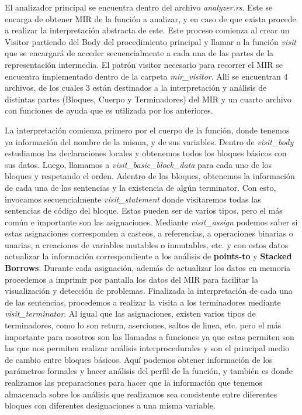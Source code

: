 El analizador principal se encuentra dentro del archivo \textit{analyzer.rs}. Este se encarga de obtener MIR de la función a analizar, y en caso de que exista procede a realizar la interpretación abstracta de este. Este proceso comienza al crear un Visitor partiendo del Body del procedimiento principal y llamar a la función \textit{visit} que se encargará de acceder secuencialmente a cada una de las partes de la representación intermedia. El patrón visitor necesario para recorrer el MIR se encuentra implementado dentro de la carpeta \textit{mir\_visitor}. Allí se encuentran 4 archivos, de los cuales 3 están destinados a la interpretación y análisis de distintas partes (Bloques, Cuerpo y Terminadores) del MIR y un cuarto archivo con funciones de ayuda que es utilizada por los anteriores.

La interpretación comienza primero por el cuerpo de la función, donde tenemos ya información del nombre de la misma, y de sus variables. Dentro de \textit{visit\_body} estudiamos las declaraciones locales y obtenemos todos los bloques básicos con sus datos. Luego, llamamos a \textit{visit\_basic\_block\_data} para cada uno de los bloques y respetando el orden. Adentro de los bloques, obtenemos la información de cada una de las sentencias y la existencia de algún terminator. Con esto, invocamos secuencialmente \textit{visit\_statement} donde visitaremos todas las sentencias de código del bloque. Estas pueden ser de varios tipos, pero el más común e importante son las asignaciones. Mediante \textit{visit\_assign} podemos saber si estas asignaciones corresponden a casteos, a referencias, a operaciones binarias o unarias, a creaciones de variables mutables o inmutables, etc. y con estos datos actualizar la información correspondiente a los análisis de \textbf{points-to} y \textbf{Stacked Borrows}. Durante cada asignación, además de actualizar los datos en memoria procedemos a imprimir por pantalla los datos del MIR para facilitar la visualización y detección de problemas. Finalizada la interpretación de cada una de las sentencias, procedemos a realizar la visita a los terminadores mediante \textit{visit\_terminator}. Al igual que las asignaciones, existen varios tipos de terminadores, como lo son return, aserciones, saltos de linea, etc. pero el más importante para nosotros son las llamadas a funciones ya que estas permiten son las que nos permiten realizar análisis interprocedurales y son el principal medio de cambio entre bloques básicos. Aquí podemos obtener información de los parámetros formales y hacer análisis del perfil de la función, y también es donde realizamos las preparaciones para hacer que la información que tenemos almacenada sobre los análisis que realizamos sea consistente entre diferentes bloques con diferentes designaciones a una misma variable.

